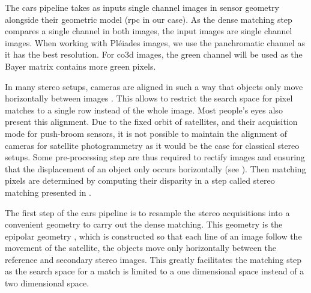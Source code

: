 The \acrshort{cars} pipeline takes as inputs single channel images in sensor geometry alongside their geometric model (\acrshort{rpc} in our case). As the dense matching step compares a single channel in both images, the input images are single channel images. When working with Pléiades images, we use the panchromatic channel as it has the best resolution. For \acrshort{co3d} images, the green channel will be used as the Bayer matrix contains more green pixels.

In many stereo setups, cameras are aligned in such a way that objects only move horizontally between images \cite{geiger_are_2012, scharstein_high-resolution_2014, keselman_intel_2017}. This allows to restrict the search space for pixel matches to a single row instead of the whole image. Most people's eyes also present this alignment. Due to the fixed orbit of satellites, and their acquisition mode for push-broom sensors, it is not possible to maintain the alignment of cameras for satellite photogrammetry as it would be the case for classical stereo setups. Some pre-processing step are thus required to rectify images and ensuring that the displacement of an object only occurs horizontally (see ). Then matching pixels are determined by computing their disparity in a step called stereo matching presented in .

The first step of the \acrshort{cars} pipeline is to resample the stereo acquisitions into a convenient geometry to carry out the dense matching. This geometry is the epipolar geometry \cite{cnes_imagerie_2008}, which is constructed so that each line of an image follow the movement of the satellite, \ie the objects move only horizontally between the reference and secondary stereo images. This greatly facilitates the matching step as the search space for a match is limited to a one dimensional space instead of a two dimensional space.

